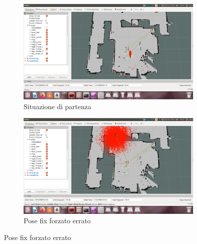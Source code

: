 %     
% 
\begin{figure}[h]
\begin{subfigure}{.5\textwidth}
  \centering
  \includegraphics[width=1\linewidth]{Capitolo3/Figs/esperimento2_1_situazione_di_partenza.png}  
  \caption{Situazione di partenza}
	\label{subfig:esp1_1}
\end{subfigure}
\begin{subfigure}{.5\textwidth}
  \centering
  \includegraphics[width=1\linewidth]{Capitolo3/Figs/esperimento2_2_pose_fix_forzato_errato.png}  
  \caption{Pose fix forzato errato}
	\label{subfig:esp1_2}
\end{subfigure}
\end{figure}
\clearpage

